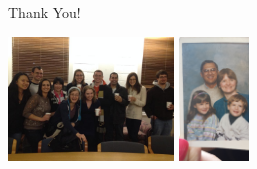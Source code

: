\documentclass[12pt]{beamer}
\begin{document}
\begin{frame}{Thank You!}
\vfill
\def\picheight{1.3in}

\includegraphics[height=\picheight]{classmates}
\hfill
\includegraphics[height=\picheight]{family}
%
\hfill
\begin{minipage}[b]{0.45in}


\end{minipage}
\end{frame}
\end{document}
